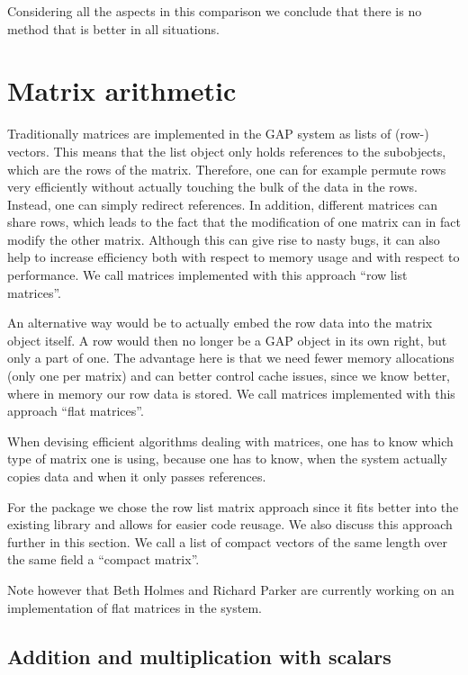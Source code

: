 Considering all the aspects in this comparison we conclude that there 
is no method that is better in all situations.


\section{Matrix arithmetic}
\label{sec:matarith}

Traditionally matrices are implemented in the {\sf GAP} system as
lists of (row-) vectors. This means that the list object only
holds references to the subobjects, which are the rows of the matrix.
Therefore, one can for example permute rows very efficiently without
actually touching the bulk of the data in the rows. Instead, one can
simply redirect references. In addition, different matrices can share
rows, which leads to the fact that the modification of one matrix
can in fact modify the other matrix. Although this can give rise to
nasty bugs, it can also help to increase efficiency both with respect
to memory usage and with respect to performance. We call matrices
implemented with this approach ``row list matrices''.

An alternative way would be to actually embed the row data into the
matrix object itself. A row would then no longer be a {\sf GAP} object
in its own right, but only a part of one. The advantage here is that
we need fewer memory allocations (only one per matrix) and can better
control cache issues, since we know better, where in memory our row data
is stored. We call matrices implemented with this approach ``flat
matrices''.

When devising efficient algorithms dealing with matrices, one has to know
which type of matrix one is using, because one has to know, when the
system actually copies data and when it only passes references.

For the {\cvec} package we chose the row list matrix approach since it fits
better into the existing {\GAP} library and allows for easier code reusage.
We also discuss this approach further in this section. We call a list
of compact vectors of the same length over the same field a ``compact
matrix''.

Note however that Beth Holmes and Richard Parker are currently working
on an implementation of flat matrices in the {\GAP} system.


\subsection{Addition and multiplication with scalars}
\label{addmulsca}

